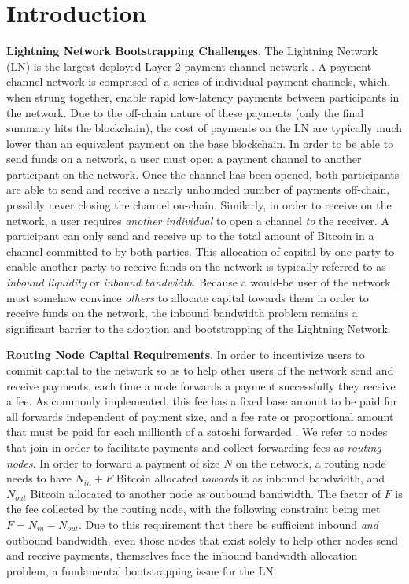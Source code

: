 \documentclass[10pt,a4paper]{article}
\theoremstyle{definition}
\begin{document}
\tableofcontents

\vfill

\section{Introduction}

\textbf{Lightning Network Bootstrapping Challenges}. The Lightning Network (LN)
is the largest deployed Layer 2 payment channel network \cite{lnpaper}.  A
payment channel network is comprised of a series of individual payment
channels, which, when strung together, enable rapid low-latency payments
between participants in the network. Due to the off-chain nature of these
payments (only the final summary hits the blockchain), the cost of payments on
the LN are typically much lower than an equivalent payment on the base
blockchain. In order to be able to send funds on a network, a user must open a
payment channel to another participant on the network. Once the channel has
been opened, both participants are able to send and receive a nearly unbounded
number of payments off-chain, possibly never closing the channel on-chain.
Similarly, in order to receive on the network, a user requires \emph{another
individual} to open a channel \emph{to} the receiver. A participant can only
send and receive up to the total amount of Bitcoin in a channel committed to by
both parties. This allocation of capital by one party to enable another party
to receive funds on the network is typically referred to as \emph{inbound
liquidity} or \emph{inbound bandwidth}.  Because a would-be user of the network
must somehow convince \emph{others} to allocate capital towards them in order
to receive funds on the network, the inbound bandwidth problem remains a
significant barrier to the adoption and bootstrapping of the Lightning Network.

\textbf{Routing Node Capital Requirements}.  In order to incentivize users to
commit capital to the network so as to help other users of the network send and
receive payments, each time a node forwards a payment successfully they receive
a fee. As commonly implemented, this fee has a fixed base amount to be paid for
all forwards independent of payment size, and a fee rate or proportional amount
that must be paid for each millionth of a satoshi forwarded \cite{bolt7}. We
refer to nodes that join in order to facilitate payments and collect forwarding
fees as \emph{routing nodes}. In order to forward a payment of size $N$ on the
network, a routing node needs to have $N_{in} + F$ Bitcoin allocated
\emph{towards} it as inbound bandwidth, and $N_{out}$ Bitcoin allocated to
another node as outbound bandwidth. The factor of $F$ is the fee collected by
the routing node, with the following constraint being met $F = N_{in} -
N_{out}$. Due to this requirement that there be sufficient inbound \emph{and}
outbound bandwidth, even those nodes that exist solely to help other nodes send
and receive payments, themselves face the inbound bandwidth allocation problem,
a fundamental bootstrapping issue for the LN.
\end{document}
